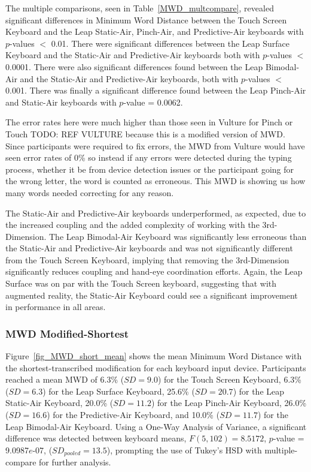 The multiple comparisons, seen in Table~\ref{MWD_multcompare}, revealed significant differences in Minimum Word Distance between the Touch Screen Keyboard and the Leap Static-Air, Pinch-Air, and Predictive-Air keyboards with $p$-values $<$ 0.01. There were significant differences between the Leap Surface Keyboard and the Static-Air and Predictive-Air keyboards both with $p$-values $<$ 0.0001. There were also significant differences found between the Leap Bimodal-Air and the Static-Air and Predictive-Air keyboards, both with $p$-values $<$ 0.001. There was finally a significant difference found between the Leap Pinch-Air and Static-Air keyboards with $p$-value = 0.0062.

The error rates here were much higher than those seen in Vulture for Pinch or Touch TODO: REF VULTURE because this is a modified version of MWD. Since participants were required to fix errors, the MWD from Vulture would have seen error rates of 0\% so instead if any errors were detected during the typing process, whether it be from device detection issues or the participant going for the wrong letter, the word is counted as erroneous. This MWD is showing us how many words needed correcting for any reason.

The Static-Air and Predictive-Air keyboards underperformed, as expected, due to the increased coupling and the added complexity of working with the 3rd-Dimension. The Leap Bimodal-Air Keyboard was significantly less erroneous than the Static-Air and Predictive-Air keyboards and was not significantly different from the Touch Screen Keyboard, implying that removing the 3rd-Dimension significantly reduces coupling and hand-eye coordination efforts. Again, the Leap Surface was on par with the Touch Screen keyboard, suggesting that with augmented reality, the Static-Air Keyboard could see a significant improvement in performance in all areas.

\subsubsection{MWD Modified-Shortest}
Figure~\ref{fig_MWD_short_mean} shows the mean Minimum Word Distance with the shortest-transcribed modification for each keyboard input device. Participants reached a mean MWD of 6.3\% ($SD = 9.0$) for the Touch Screen Keyboard, 6.3\% ($SD = 6.3$) for the Leap Surface Keyboard, 25.6\% ($SD = 20.7$) for the Leap Static-Air Keyboard, 20.0\% ($SD = 11.2$) for the Leap Pinch-Air Keyboard, 26.0\% ($SD = 16.6$) for the Predictive-Air Keyboard, and 10.0\% ($SD = 11.7$) for the Leap Bimodal-Air Keyboard. Using a One-Way Analysis of Variance, a significant difference was detected between keyboard means, $F(5, 102) = 8.5172$, $p$-value = 9.0987$e$-07, ($SD_{pooled} = 13.5$), prompting the use of Tukey's HSD with multiple-compare for further analysis.

